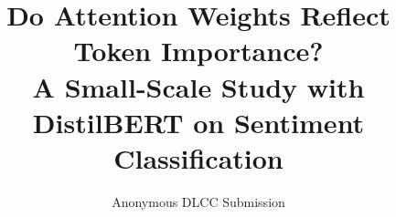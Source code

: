 \documentclass[10pt,twocolumn,letterpaper]{article}
\begin{document}
\title{Do Attention Weights Reflect Token Importance?\\A Small-Scale Study with DistilBERT on Sentiment Classification}

\author{Anonymous DLCC Submission}

\maketitle









{\small


}

\clearpage
\appendix

\end{document}
